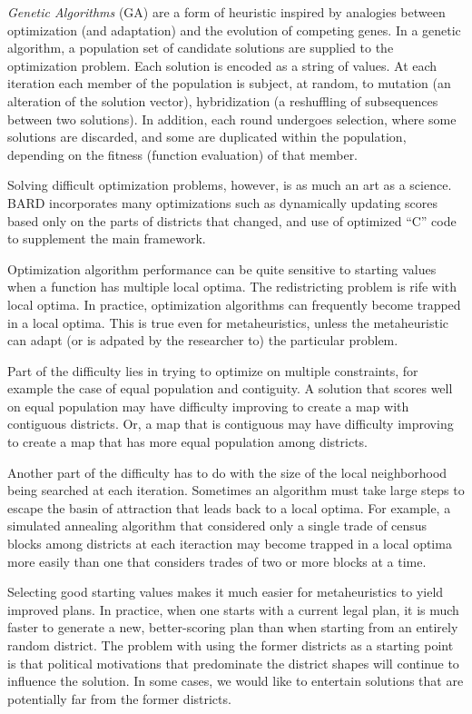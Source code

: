\documentclass[article]{JSSstyle/jss}
\begin{document}
\emph{Genetic Algorithms} (GA) are a form of heuristic inspired by analogies 
between optimization (and adaptation) and the evolution of competing
genes.  In a genetic algorithm, a population set of candidate solutions are supplied to the optimization problem. 
Each solution is encoded as a string of values. At each iteration each member of the population is subject, at random, 
to mutation (an alteration of the solution vector), hybridization (a reshuffling of subsequences between two solutions). 
In addition, each round undergoes selection, where some solutions are discarded, and some are 
duplicated within the population, depending on the fitness (function evaluation) of that member.

Solving difficult optimization problems, however, is as much an art as a science.  
BARD incorporates many optimizations such as dynamically updating
scores based only on the parts of districts that changed, and use of optimized ``C'' code
to supplement the main  framework.

Optimization algorithm performance can be quite sensitive to starting values when a function has
multiple local optima.  The redistricting problem is rife with local optima.  In practice, optimization algorithms 
can frequently become trapped in a local optima. This is true even for metaheuristics, 
unless the metaheuristic can adapt (or is adpated by the researcher to) the particular problem.  

Part of the difficulty lies in trying to optimize on multiple constraints, for example the case of equal population and contiguity.  
A solution that scores well on equal population may have difficulty improving to create a map with contiguous districts. 
Or, a map that is contiguous may have difficulty improving to create a map that has more equal population among districts. 

Another part of the difficulty has to do with the size of the local neighborhood being searched at each iteration.  
Sometimes an algorithm must take large steps to escape the basin of attraction that leads back to a local optima. 
For example, a simulated annealing algorithm that considered only a single trade of census blocks among districts at each iteraction 
may become trapped in a local optima more easily than one that considers trades of two or more blocks at a time.  
	
Selecting good starting values makes it much easier for metaheuristics to yield improved plans.  
In practice, when one starts with a current legal plan, it is much faster to generate a new, better-scoring plan 
than when starting from an entirely random district.  The problem with using the former districts as a starting point is that 
political motivations that predominate the district shapes will continue to influence the solution.  In some cases, we would 
like to entertain solutions that are potentially far from the former districts.
\end{document}
